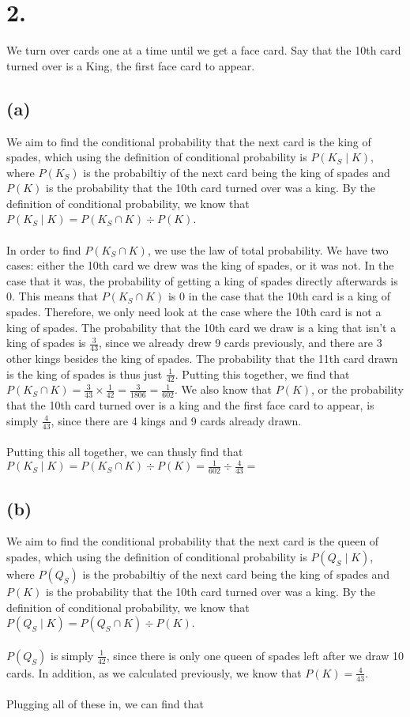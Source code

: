 \documentclass{article}
\begin{document}
\section*{2.}
{\Large
We turn over cards one at a time until we get a face card. Say that the 10th card turned over is a King, the first face card to appear.

\subsection*{(a)}
We aim to find the conditional probability that the next card is the king of spades, which using the definition of conditional probability is $P(K_S \mid K)$, where $P(K_S)$ is the probabiltiy of the next card being the king of spades and $P(K)$ is the probability that the 10th card turned over was a king. By the definition of conditional probability, we know that $P(K_S \mid K) = P(K_S \cap K) \div P(K)$. \\ \\
In order to find $P(K_S \cap K)$, we use the law of total probability. We have two cases: either the 10th card we drew was the king of spades, or it was not. In the case that it was, the probability of getting a king of spades directly afterwards is 0. This means that $P(K_S \cap K)$ is 0 in the case that the 10th card is a king of spades. Therefore, we only need look at the case where the 10th card is not a king of spades. The probability that the 10th card we draw is a king that isn't a king of spades is $\frac{3}{43}$, since we already drew 9 cards previously, and there are 3 other kings besides the king of spades. The probability that the 11th card drawn is the king of spades is thus just $\frac{1}{42}$. Putting this together, we find that $P(K_S \cap K) = \frac{3}{43} \times \frac{1}{42} = \frac{3}{1806} = \frac{1}{602}$. We also know that $P(K)$, or the probability that the 10th card turned over is a king and the first face card to appear, is simply $\frac{4}{43}$, since there are 4 kings and 9 cards already drawn. \\ \\
Putting this all together, we can thusly find that $P(K_S \mid K) = P(K_S \cap K) \div P(K) = \frac{1}{602} \div \frac{4}{43} = $ 

\subsection*{(b)}
We aim to find the conditional probability that the next card is the queen of spades, which using the definition of conditional probability is $P(Q_S \mid K)$, where $P(Q_S)$ is the probabiltiy of the next card being the king of spades and $P(K)$ is the probability that the 10th card turned over was a king. By the definition of conditional probability, we know that $P(Q_S \mid K) = P(Q_S \cap K) \div P(K)$. \\ \\ 
$P(Q_S)$ is simply $\frac{1}{42}$, since there is only one queen of spades left after we draw 10 cards. In addition, as we calculated previously, we know that $P(K) = \frac{4}{43}$. \\ \\ 
Plugging all of these in, we can find that 

}
\end{document}
